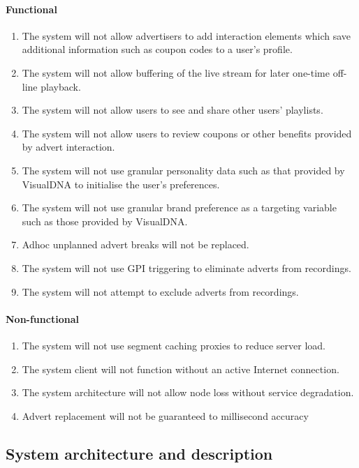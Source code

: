 \paragraph{Functional}
		\begin{enumerate}
			\item{The system will not allow advertisers to add interaction elements which save additional information such as coupon codes to a user's profile.}
			\item{The system will not allow buffering of the live stream for later one-time off-line playback.}
			\item{The system will not allow users to see and share other users' playlists.}
			\item{The system will not allow users to review coupons or other benefits provided by advert interaction.}
			\item{The system will not use granular personality data such as that provided by VisualDNA to initialise the user's preferences.}
			\item{The system will not use granular brand preference as a targeting variable such as those provided by VisualDNA.}
			\item{Adhoc unplanned advert breaks will not be replaced.}
			\item{The system will not use GPI triggering to eliminate adverts from recordings.}
			\item{The system will not attempt to exclude adverts from recordings.}
		\end{enumerate}
\paragraph{Non-functional}
		\begin{enumerate}
			\item{The system will not use segment caching proxies to reduce server load.}
			\item{The system client will not function without an active Internet connection.}
			\item{The system architecture will not allow node loss without service degradation.}
			\item{Advert replacement will not be guaranteed to millisecond accuracy}
		\end{enumerate}

\subsection{System architecture and description}

